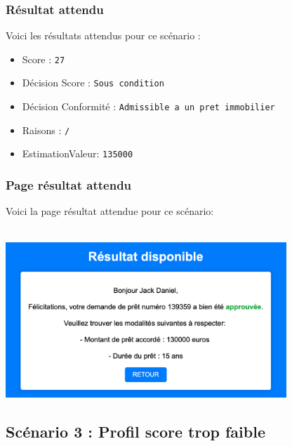 \documentclass{article}
\begin{document}
        \subsubsection{Résultat attendu}
        Voici les résultats attendus pour ce scénario :
        \begin{itemize}
            \item Score : \texttt{27}
            \item Décision Score : \texttt{Sous condition}
            \item Décision Conformité : \texttt{Admissible a un pret immobilier}
            \item Raisons : \texttt{/}
            \item EstimationValeur: \texttt{135000}
        \end{itemize}
        
        \subsubsection{Page résultat attendu}
        Voici la page résultat attendue pour ce scénario: \\
        \\
        \begin{center}
            \includegraphics[width=300pt]{Images/12.2/resultat2.png}\\
        \end{center}

  \newpage
  
    \subsection{Scénario 3 : Profil score trop faible}
\end{document}
